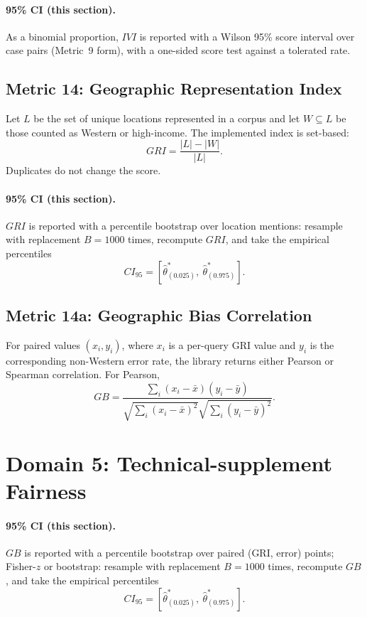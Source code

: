 \documentclass[11pt]{article}
\begin{document}
\paragraph{95\% CI (this section).} As a binomial proportion, $IVI$ is reported with a Wilson 95\% score interval over case pairs (Metric~9 form), with a one-sided score test against a tolerated rate.

\subsection{Metric 14: Geographic Representation Index}

Let $L$ be the set of unique locations represented in a corpus and let
$W\subseteq L$ be those counted as Western or high-income. The implemented index
is set-based:
\begin{equation}
GRI=\frac{|L|-|W|}{|L|}.
\end{equation}
Duplicates do not change the score.


\paragraph{95\% CI (this section).} $GRI$ is reported with a percentile bootstrap over location mentions: resample with replacement $B=1000$ times, recompute $GRI$, and take the empirical percentiles
\begin{equation}
CI_{95}=\left[\hat\theta^{\ast}_{(0.025)},\ \hat\theta^{\ast}_{(0.975)}\right].
\end{equation}

\subsection{Metric 14a: Geographic Bias Correlation}

For paired values $(x_i,y_i)$, where $x_i$ is a per-query GRI value and $y_i$ is
the corresponding non-Western error rate, the library returns either Pearson or
Spearman correlation. For Pearson,
\begin{equation}
GB =
\frac{\sum_i(x_i-\bar x)(y_i-\bar y)}
{\sqrt{\sum_i(x_i-\bar x)^2}\sqrt{\sum_i(y_i-\bar y)^2}}.
\end{equation}

\section{Domain 5: Technical-supplement Fairness}


\paragraph{95\% CI (this section).} $GB$ is reported with a percentile bootstrap over paired (GRI, error) points; Fisher-$z$ or bootstrap: resample with replacement $B=1000$ times, recompute $GB$, and take the empirical percentiles
\begin{equation}
CI_{95}=\left[\hat\theta^{\ast}_{(0.025)},\ \hat\theta^{\ast}_{(0.975)}\right].
\end{equation}
\end{document}
